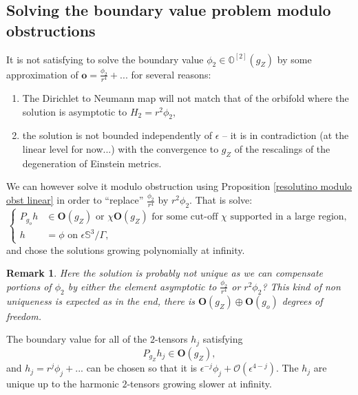 \documentclass[12pt]{article}
\newtheorem{rem}[thm]{Remark}
\begin{document}
   \subsection{Solving the boundary value problem modulo obstructions}
   
   It is not satisfying to solve the boundary value $\phi_2\in \mathbb{O}^{[2]}({g_Z})$ by some approximation of $\mathbf{o} = \frac{\phi_2}{r^4} +...$ for several reasons:
   \begin{enumerate}
       \item The Dirichlet to Neumann map will not match that of the orbifold where the solution is asymptotic to $H_2=r^2\phi_2$,
       \item the solution is not bounded independently of $\epsilon$ -- it is in contradiction (at the linear level for now...) with the convergence to ${g_Z}$ of the rescalings of the degeneration of Einstein metrics.
   \end{enumerate}
   
   We can however solve it modulo obstruction using Proposition \ref{resolutino modulo obst linear} in order to ``replace'' $\frac{\phi_2}{r^4}$ by $r^2\phi_2$. That is solve:
   \begin{equation}
       \left\{\begin{aligned}
            P_{g_o} h &\in \mathbf{O}({g_Z}) \text{ or } \chi\mathbf{O}({g_Z}) \text{ for some cut-off } \chi \text{ supported in a large region},\\
            h &= \phi \text{ on } \epsilon\mathbb{S}^3\slash\Gamma,
       \end{aligned}\right.\label{boundary orb obst}
   \end{equation}
   and chose the solutions growing polynomially at infinity.
   \begin{rem}
    Here the solution is probably not unique as we can compensate portions of $\phi_2$ by either the element asymptotic to $\frac{\phi_2}{r^4}$ or $r^2\phi_2$? This kind of non uniqueness is expected as in the end, there is $\mathbf{O}({g_Z})\oplus \mathbf{O}(g_o)$ degrees of freedom.
   \end{rem}
   
   The boundary value for all of the $2$-tensors $h_j$ satisfying
   $$ P_{{g_Z}} h_j \in \mathbf{O}({g_Z}), $$
   and $h_j = r^j\phi_j + ...$ can be chosen so that it is $\epsilon^{-j}\phi_j +\mathcal{O}(\epsilon^{4-j})$. The $h_j$ are unique up to the harmonic $2$-tensors growing slower at infinity.
   
\end{document}
